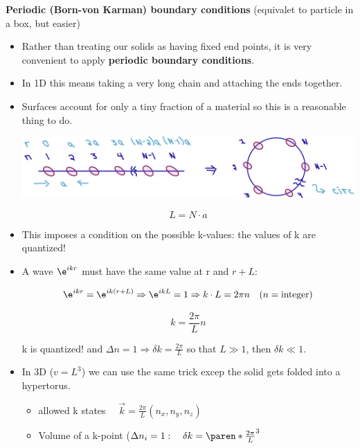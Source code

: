 \textbf{Periodic (Born-von Karman) boundary conditions}
(equivalet to particle in a box, but easier)
\begin{itemize}
    \item Rather than treating our solids as having fixed end points, it is very convenient to apply \textbf{periodic boundary conditions}. 
    
    \item In 1D this means taking a very long chain and attaching the ends together.
    \item Surfaces account for only a tiny fraction of a material so this is a reasonable thing to do.

    \begin{center}
        \includegraphics[width = 0.9 \linewidth]{Images/Born-von Karman - PBC.png}
    \end{center}

    \[ L = N \cdot a\]

    \item This imposes a condition on the possible k-values: the values of k are quantized!

    \item A wave $\e^{i k r}$ must have the same value at r and $r + L$:

    \[ \e^{i k r} = \e^{ik (r+L)} \Rightarrow \e^{i k L} = 1 \Rightarrow k \cdot L = 2 \pi n \quad (n=\text{integer}) \]

    \[ \boxed{k = \frac{2 \pi}{L} n}\]

    k is quantized! and $\Delta n = 1 \Rightarrow \boxed{\delta k = \frac{2\pi}{L}}$ so that $L \gg 1$, then $\delta k \ll 1$.

    \item In 3D ($v = L^3$) we can use the same trick excep the solid gets folded into a hypertorus.

    \begin{itemize}
        \item allowed k states $\quad \vec{k} = \frac{2\pi}{L} (n_x, n_y, n_z)$
        \item Volume of a k-point ($\Delta n_i = 1 : \quad \delta k = \paren*{\frac{2 \pi}{L}}^3$
    \end{itemize}


\end{itemize}
